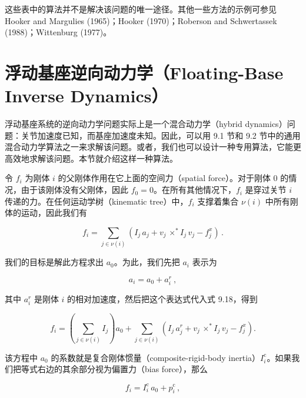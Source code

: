 \documentclass[10pt,a4paper]{book}
\theoremstyle{thmstyle} %
\theoremstyle{defstyle} %
\theoremstyle{prostyle} %
\begin{document}
这些表中的算法并不是解决该问题的唯一途径。其他一些方法的示例可参见 Hooker and Margulies (1965)；Hooker (1970)；Roberson and Schwertassek (1988)；Wittenburg (1977)。



\section{浮动基座逆向动力学（Floating-Base Inverse Dynamics）}





浮动基座系统的逆向动力学问题实际上是一个混合动力学（hybrid dynamics）问题：关节加速度已知，而基座加速度未知。因此，可以用 9.1 节和 9.2 节中的通用混合动力学算法之一来求解该问题。或者，我们也可以设计一种专用算法，它能更高效地求解该问题。本节就介绍这样一种算法。



令 $f_{i}$ 为刚体 $i$ 的父刚体作用在它上面的空间力（spatial force）。对于刚体 0 的情况，由于该刚体没有父刚体，因此 $f_{0}=0$。在所有其他情况下，$f_{i}$ 是穿过关节 $i$ 传递的力。在任何运动学树（kinematic tree）中，$f_{i}$ 支撑着集合 $\nu(i)$ 中所有刚体的运动，因此我们有



$$
f _ { i } = \sum _ { j \in \nu ( i ) } ( I _ { j } \, a _ { j } + v _ { j } \, \times ^{*} I _ { j } \, v _ { j } - f _ { j } ^{x} ) \, .
$$



我们的目标是解此方程求出 $a_{0}$。为此，我们先把 $a_{i}$ 表示为



$$
a _ { i } = a _ { 0 } + a _ { i } ^{r} \ ,
$$



其中 $a_{i}^{r}$ 是刚体 $i$ 的相对加速度，然后把这个表达式代入式 9.18，得到



$$
f _ { i } = \left( \sum _ { j \in \nu ( i ) } I _ { j } \right) a _ { 0 } + \sum _ { j \in \nu ( i ) } \left( I _ { j } \, a _ { j } ^{r} + v _ { j } \, \times ^{*} I _ { j } \, v _ { j } - f _ { j } ^{x} \right) .
$$



该方程中 $a_{0}$ 的系数就是复合刚体惯量（composite-rigid-body inertia）$I_{i}^{\mathrm{c}}$。如果我们把等式右边的其余部分视为偏置力（bias force），那么



$$
f _ { i } = I _ { i } ^{\mathrm { c} } \, a _ { 0 } + p _ { i } ^{\mathrm { c} } \, ,
$$
\end{document}
